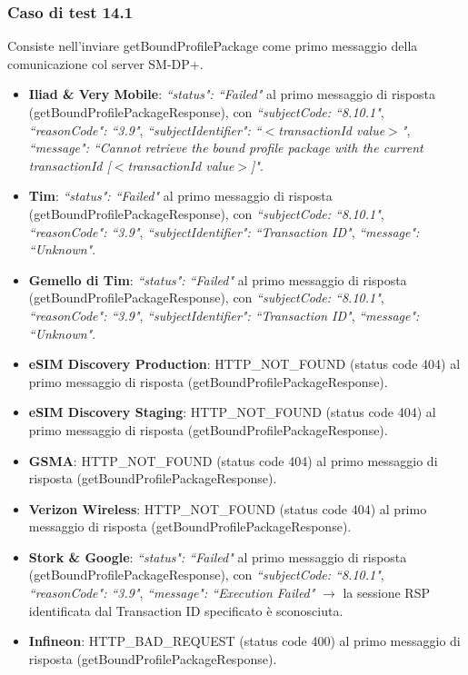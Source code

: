 \documentclass[10pt, oneside]{book}
\begin{document}
\subsubsection{Caso di test 14.1}
Consiste nell'inviare getBoundProfilePackage come primo messaggio della comunicazione col server SM-DP+.
\begin{itemize}
\item \textbf{Iliad \& Very Mobile}: \textit{``status": ``Failed"} al primo messaggio di risposta (getBoundProfilePackageResponse), con \textit{``subjectCode: ``8.10.1"}, \textit{``reasonCode": ``3.9"}, \textit{``subjectIdentifier": ``$<$transactionId value$>$"}, \textit{``message": ``Cannot retrieve the bound profile package with the current transactionId [$<$transactionId value$>$]"}.
\item \textbf{Tim}: \textit{``status": ``Failed"} al primo messaggio di risposta (getBoundProfilePackageResponse), con \textit{``subjectCode: ``8.10.1"}, \textit{``reasonCode": ``3.9"}, \textit{``subjectIdentifier": ``Transaction ID"}, \textit{``message": ``Unknown"}.
\item \textbf{Gemello di Tim}: \textit{``status": ``Failed"} al primo messaggio di risposta (getBoundProfilePackageResponse), con \textit{``subjectCode: ``8.10.1"}, \textit{``reasonCode": ``3.9"}, \textit{``subjectIdentifier": ``Transaction ID"}, \textit{``message": ``Unknown"}.
\item \textbf{eSIM Discovery Production}: HTTP\_NOT\_FOUND (status code 404) al primo messaggio di risposta (getBoundProfilePackageResponse).
\item \textbf{eSIM Discovery Staging}: HTTP\_NOT\_FOUND (status code 404) al primo messaggio di risposta (getBoundProfilePackageResponse).
\item \textbf{GSMA}: HTTP\_NOT\_FOUND (status code 404) al primo messaggio di risposta (getBoundProfilePackageResponse).
\item \textbf{Verizon Wireless}: HTTP\_NOT\_FOUND (status code 404) al primo messaggio di risposta (getBoundProfilePackageResponse).
\item \textbf{Stork \& Google}: \textit{``status": ``Failed"} al primo messaggio di risposta (getBoundProfilePackageResponse), con \textit{``subjectCode: ``8.10.1"}, \textit{``reasonCode": ``3.9"}, \textit{``message": ``Execution Failed"} $\rightarrow$ la sessione RSP identificata dal Transaction ID specificato è sconosciuta.
\item \textbf{Infineon}: HTTP\_BAD\_REQUEST (status code 400) al primo messaggio di risposta (getBoundProfilePackageResponse).

\end{itemize}
\end{document}

